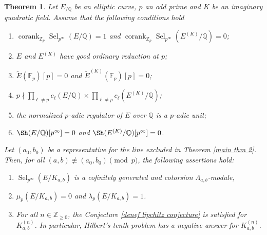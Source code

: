 \documentclass[12pt]{amsart}
\newtheorem{theorem}{Theorem}[section]
\newcommand{\Z}{\mathbb{Z}}
\newcommand{\Q}{\mathbb{Q}}
\newcommand{\F}{\mathbb{F}}
\newcommand{\op}[1]{\operatorname{#1}}
\numberwithin{equation}{section}
\begin{document}
\begin{theorem}\label{main thm 3}
    Let $E_{/\Q}$ be an elliptic curve, $p$ an odd prime and $K$ be an imaginary quadratic field. Assume that the following conditions hold
    \begin{enumerate}
        \item $\op{corank}_{\Z_p} \op{Sel}_{p^\infty}(E/\Q)=1$ and $\op{corank}_{\Z_p} \op{Sel}_{p^\infty}(E^{(K)}/\Q)=0$;
        \item $E$ and $E^{(K)}$ have good ordinary reduction at $p$; 
        \item $\widetilde{E}(\F_p)[p]=0$ and $\widetilde{E}^{(K)}(\F_p)[p]=0$;
        \item $p\nmid \prod_{\ell\neq p} c_\ell(E/\Q)\times \prod_{\ell\neq p} c_\ell(E^{(K)}/\Q)$;
        \item the normalized $p$-adic regulator of $E$ over $\Q$ is a $p$-adic unit;
        \item $\Sh(E/\Q)[p^\infty]=0$ and $\Sh(E^{(K)}/\Q)[p^\infty]=0$.
    \end{enumerate}
    Let $(a_0,b_0)$ be a representative for the line excluded in Theorem \ref{main thm 2}. 
    Then, for all $(a,b)\not \equiv (a_0, b_0)\pmod{p}$, the following assertions hold:
    \begin{enumerate}
        \item $\op{Sel}_{p^\infty}(E/K_{a,b})$ is a cofinitely generated and cotorsion $\Lambda_{a,b}$-module,
        \item $\mu_p(E/K_{a,b})=0$ and $\lambda_p(E/K_{a,b})=1$.
        \item For all $n\in \Z_{\geq 0}$, the Conjecture \ref{denef lipchitz conjecture} is satisfied for $K_{a,b}^{(n)}$. In particular, Hilbert's tenth problem has a negative answer for $K_{a,b}^{(n)}$.
    \end{enumerate} 
\end{theorem}
\end{document}
